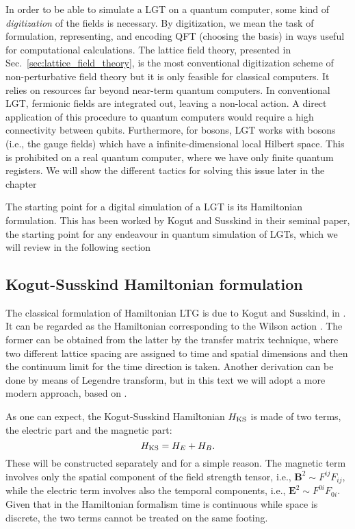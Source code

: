 In order to be able to simulate a LGT on a quantum computer, some kind of \emph{digitization} of the fields is necessary.
By digitization, we mean the task of formulation, representing, and encoding QFT (choosing the basis) in ways useful for computational calculations.
The lattice field theory, presented in Sec.~\ref{sec:lattice_field_theory}, is the most conventional digitization scheme of non-perturbative field theory but it is only feasible for classical computers.
It relies on resources far beyond near-term quantum computers.
In conventional LGT, fermionic fields are integrated out, leaving a non-local action.
A direct application of this procedure to quantum computers would require a high connectivity between qubits.
Furthermore, for bosons, LGT works with bosons (i.e., the gauge fields) which have a infinite-dimensional local Hilbert space.
This is prohibited on a real quantum computer, where we have only finite quantum registers.
We will show the different tactics for solving this issue later in the chapter

The starting point for a digital simulation of a LGT is its Hamiltonian formulation.
This has been worked by Kogut and Susskind in their seminal paper\citneeded, the starting point for any endeavour in quantum simulation of LGTs, which we will review in the following section


\subsection{Kogut-Susskind Hamiltonian formulation}
\label{sub:kogut_susskind_hamiltonian_formulation}

The classical formulation of Hamiltonian LTG is due to Kogut and Susskind, in \citneeded.
It can be regarded as the Hamiltonian corresponding to the Wilson action .
The former can be obtained from the latter by the transfer matrix technique\citneeded, where two different lattice spacing are assigned to time and spatial dimensions and then the continuum limit for the time direction is taken.
Another derivation can be done by means of Legendre transform, but in this text we will adopt a more modern approach, based on .

As one can expect, the Kogut-Susskind Hamiltonian $H_{\text{KS}}$ is made of two terms, the electric part and the magnetic part:
\begin{equation}
    H_{\text{KS}} = H_E + H_B.
\end{equation}
These will be constructed separately and for a simple reason.
The magnetic term involves only the spatial component of the field strength tensor, i.e., $\bm{B}^{2} \sim F^{ij}F_{ij}$, while the electric term involves also the temporal components, i.e., $\bm{E}^2 \sim F^{0i} F_{0i}$.
Given that in the Hamiltonian formalism time is continuous while space is discrete, the two terms cannot be treated on the same footing.

